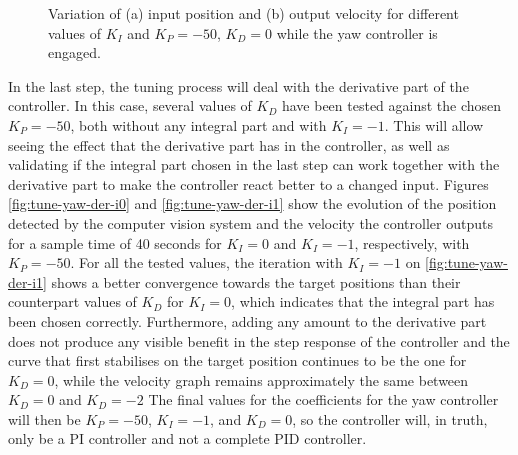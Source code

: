 \begin{figure}
  \centering
  \caption{Variation of (a) input position and (b) output velocity for different values of $K_{I}$ and $K_P=-50$, $K_D=0$ while the yaw controller is engaged.}\label{fig:tune-yaw-int-50}
\end{figure}

In the last step, the tuning process will deal with the derivative part of the controller.
In this case, several values of $K_D$ have been tested against the chosen $K_P=-50$, both without any integral part and with $K_I=-1$.
This will allow seeing the effect that the derivative part has in the controller, as well as validating if the integral part chosen in the last step can work together with the derivative part to make the controller react better to a changed input.
Figures \ref{fig:tune-yaw-der-i0} and \ref{fig:tune-yaw-der-i1} show the evolution of the position detected by the computer vision system and the velocity the controller outputs for a sample time of 40 seconds for $K_I=0$ and $K_I=-1$, respectively, with $K_P=-50$.
For all the tested values, the iteration with $K_I=-1$ on \ref{fig:tune-yaw-der-i1} shows a better convergence towards the target positions than their counterpart values of $K_D$ for $K_I=0$, which indicates that the integral part has been chosen correctly.
Furthermore, adding any amount to the derivative part does not produce any visible benefit in the step response of the controller and the curve that first stabilises on the target position continues to be the one for $K_D=0$, while the velocity graph remains approximately the same between $K_D=0$ and $K_D=-2$
The final values for the coefficients for the yaw controller will then be $K_P=-50$, $K_I=-1$, and $K_D=0$, so the controller will, in truth, only be a PI controller and not a complete PID controller.


